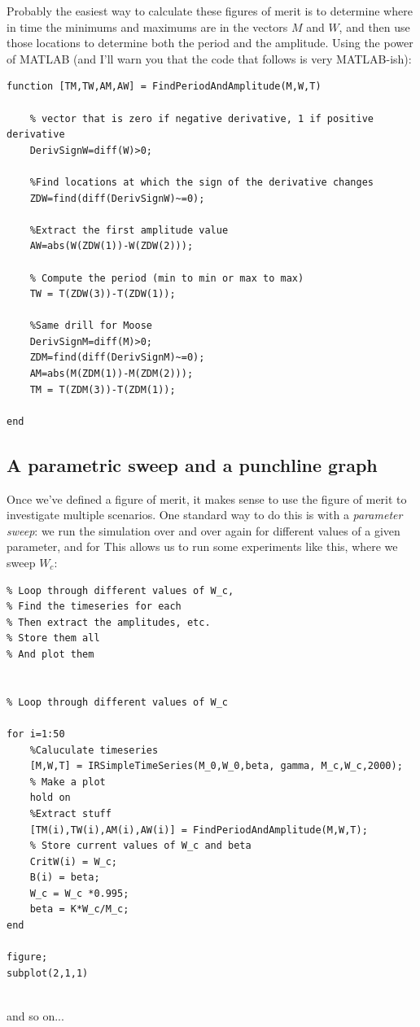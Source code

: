 \documentclass{tufte-handout}
\begin{document}
Probably the easiest way to calculate these figures of merit is to determine where in time the minimums and maximums are in the vectors $M$ and $W$, and then use those locations to determine both the period and the amplitude.  Using the power of MATLAB (and I'll warn you that the code that follows is very MATLAB-ish):

\begin{verbatim}
function [TM,TW,AM,AW] = FindPeriodAndAmplitude(M,W,T)

    % vector that is zero if negative derivative, 1 if positive derivative
    DerivSignW=diff(W)>0; 

    %Find locations at which the sign of the derivative changes
    ZDW=find(diff(DerivSignW)~=0); 

    %Extract the first amplitude value
    AW=abs(W(ZDW(1))-W(ZDW(2))); 

    % Compute the period (min to min or max to max)
    TW = T(ZDW(3))-T(ZDW(1)); 

    %Same drill for Moose
    DerivSignM=diff(M)>0; 
    ZDM=find(diff(DerivSignM)~=0); 
    AM=abs(M(ZDM(1))-M(ZDM(2))); 
    TM = T(ZDM(3))-T(ZDM(1));

end
\end{verbatim}

\subsection{A parametric sweep and a punchline graph}

Once we've defined a figure of merit, it makes sense to use the figure of merit to investigate multiple scenarios.  One standard way to do this is with a {\it parameter sweep}:  we run the simulation over and over again for different values of a given parameter, and for This allows us to run some experiments like this, where we sweep $W_c$:

\begin{verbatim}
% Loop through different values of W_c,
% Find the timeseries for each
% Then extract the amplitudes, etc.
% Store them all
% And plot them


% Loop through different values of W_c

for i=1:50
    %Caluculate timeseries
    [M,W,T] = IRSimpleTimeSeries(M_0,W_0,beta, gamma, M_c,W_c,2000);
    % Make a plot
    hold on
    %Extract stuff
    [TM(i),TW(i),AM(i),AW(i)] = FindPeriodAndAmplitude(M,W,T);
    % Store current values of W_c and beta
    CritW(i) = W_c;
    B(i) = beta;
    W_c = W_c *0.995;
    beta = K*W_c/M_c;
end

figure;
subplot(2,1,1)
    
\end{verbatim}
and so on...
\end{document}
